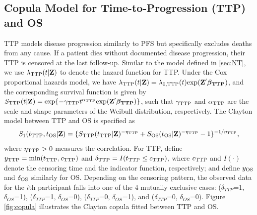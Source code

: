 \subsection{Copula Model for Time-to-Progression (TTP) and OS} \label{sec:method_copula}
TTP models disease progression similarly to \ac{PFS} but specifically excludes deaths from any cause. If a patient dies without documented disease progression, their TTP is censored at the last follow-up. Similar to the model defined in  \ref{sec:NT}, we use $\lambda_{\rm TTP}(t|\textbf{Z})$ to
denote the hazard function for TTP. Under the Cox
proportional hazards model, we have $\lambda_{\rm TTP}(t|\textbf{Z})=\lambda_{0, \rm TTP}(t)\mathrm{exp}(\textbf{Z}' \boldsymbol{\beta_{\rm TTP}})$, and the corresponding survival function is given by
$S_{\rm TTP}(t|\textbf{Z})=\mathrm{exp}\{-\gamma_{\rm TTP} t^{\alpha_{\rm TTP}}
\mathrm{exp}(\textbf{Z}' \boldsymbol{\beta_{\rm TTP}} )\}$, such that $\gamma_{\rm TTP}$ and $\alpha_{\rm TTP}$ are the scale and shape parameters
of the Weibull distribution, respectively. The Clayton model between \ac{TTP} and \ac{OS} is specified as
\begin{equation*}
S_1(t_{\rm TTP},
t_{\rm OS}|\textbf{Z})=\{S_{\rm TTP}(t_{\rm TTP}|\textbf{Z})^{-\eta_{\rm TTP}}
+S_{\rm OS}(t_{\rm OS}|\textbf{Z})^{-\eta_{\rm TTP}}-1\}^{-1/\eta_{\rm TTP}}, 
\end{equation*}
where $\eta_{\rm TTP}>0$ measures the correlation.
For TTP,
define $y_{\rm TTP}=\mathrm{min}(t_{\rm TTP}, c_{\rm TTP})$ and
$\delta_{\rm TTP}=I(t_{\rm TTP} \le c_{\rm TTP})$,
where $c_{\rm TTP}$ and $I(\cdot)$ denote the censoring time and the indicator function,
respectively; and define $y_{\rm OS}$ and $\delta_{\rm OS}$ similarly for OS. Depending on the censoring pattern, the observed data for the $i$th participant falls into one of the 4 mutually exclusive cases: ($\delta_{TTP}$=1, $\delta_{OS}$=1), ($\delta_{TTP}$=1, $\delta_{OS}$=0),
($\delta_{TTP}$=0, $\delta_{OS}$=1), and ($\delta_{TTP}$=0, $\delta_{OS}$=0).  Figure \ref{fig:copula} illustrates the Clayton copula fitted between \ac{TTP} and OS.

